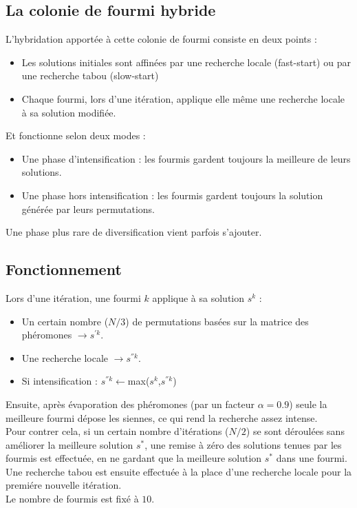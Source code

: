 \documentclass[b]{beamer}
\begin{document}
\subsection{La colonie de fourmi hybride}
\begin{frame}
L'hybridation apportée à cette colonie de fourmi consiste en deux points :\\
	\begin{itemize}
	\item Les solutions initiales sont affinées par une recherche locale (fast-start) ou par une recherche tabou (slow-start)\\
	\item Chaque fourmi, lors d'une itération, applique elle même une recherche locale à sa solution modifiée.\\
	\end{itemize}
Et fonctionne selon deux modes :
	\begin{itemize}
	\item Une phase d'intensification : les fourmis gardent toujours la meilleure de leurs solutions.
	\item Une phase hors intensification : les fourmis gardent toujours la solution générée par leurs permutations.\\[.5cm]
	\end{itemize}
Une phase plus rare de diversification vient parfois s'ajouter.
\end{frame}

\subsection{Fonctionnement}
\begin{frame}
Lors d'une itération, une fourmi $k$ applique à sa solution $s^k$ :
\begin{itemize}
	\item Un certain nombre ($N/3$) de permutations basées sur la matrice des phéromones $\rightarrow s^{'k}$.
	\item Une recherche locale $\rightarrow s^{''k}$.
	\item Si intensification : $s^{''k}\leftarrow$max($s^k$,$s^{''k}$)
\end{itemize}
Ensuite, après évaporation des phéromones (par un facteur $\alpha=0.9$) seule la meilleure fourmi dépose les siennes, ce qui rend la recherche assez intense.\\
Pour contrer cela, si un certain nombre d'itérations ($N/2$) se sont déroulées sans améliorer la meilleure solution $s^*$, une remise à zéro des solutions tenues par les fourmis est effectuée, en ne gardant que la meilleure solution $s^*$ dans une fourmi. Une recherche tabou est ensuite effectuée à la place d'une recherche locale pour la premiére nouvelle itération.\\[.5cm]
Le nombre de fourmis est fixé à $10$.
\end{frame}
\end{document}
